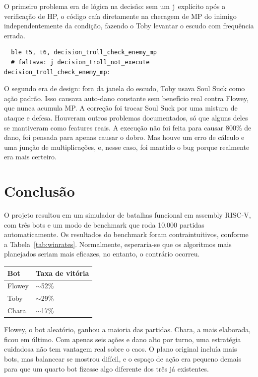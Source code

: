 \documentclass[AMA,twocolumn]{USG}
\begin{document}
O primeiro problema era de lógica na decisão: sem um \texttt{j} explícito após a verificação de HP, o código caía diretamente na checagem de MP do inimigo independentemente da condição, fazendo o Toby levantar o escudo com frequência errada.

\begin{verbatim}
  ble t5, t6, decision_troll_check_enemy_mp
  # faltava: j decision_troll_not_execute
decision_troll_check_enemy_mp:
\end{verbatim}

O segundo era de design: fora da janela do escudo, Toby usava Soul Suck como ação padrão. Isso causava auto-dano constante sem benefício real contra Flowey, que nunca acumula MP. A correção foi trocar Soul Suck por uma mistura de ataque e defesa.
Houveram outros problemas documentados, só que alguns deles se mantiveram como features reais. A execução
não foi feita para causar 800\% de dano, foi pensada para apenas causar o dobro. Mas houve um erro de cálculo e 
uma junção de multiplicações, e, nesse caso, foi mantido o bug porque realmente era mais certeiro.
\section{Conclusão}

O projeto resultou em um simulador de batalhas funcional em assembly RISC-V, com três bots e um modo de benchmark que roda 10.000 partidas automaticamente.
Os resultados do benchmark foram contraintuitivos, conforme a Tabela~\ref{tab:winrates}. Normalmente, esperaria-se que os algoritmos mais 
planejados seriam mais eficazes, no entanto, o contrário ocorreu.

\vspace{4pt}\noindent
{\renewcommand{\arraystretch}{1.5}
\begin{tabular}{ll}
\hline
\textbf{Bot} & \textbf{Taxa de vitória} \\
\hline
Flowey & $\sim$52\% \\
Toby   & $\sim$29\% \\
Chara  & $\sim$17\% \\
\hline
\end{tabular}}\label{tab:winrates}
\vspace{4pt}

Flowey, o bot aleatório, ganhou a maioria das partidas. Chara, a mais elaborada, ficou em último. Com apenas seis ações e dano alto por turno, uma estratégia cuidadosa não tem vantagem real sobre o caos. O plano original incluía mais bots, mas balancear se mostrou difícil, e o espaço de ação era pequeno demais para que um quarto bot fizesse algo diferente dos três já existentes.
\end{document}

